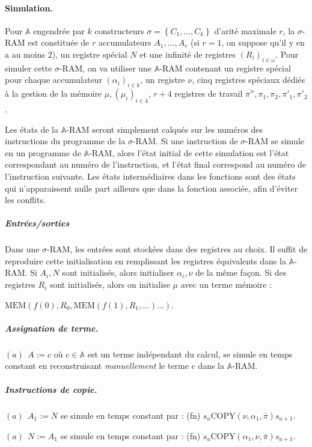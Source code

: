 \documentclass{article}
\newcommand{\bbA}{\mathbb{A}}
\begin{document}
\begin{demo}
				
				\paragraph{Simulation.}
				Pour $\bbA$ engendrée par $k$ constructeurs $\sigma = \left\lbrace C_1, \dots, C_k\right\rbrace$ d'arité maximale $r$, la $\sigma$-RAM est constituée de $r$ accumulateurs $A_1, \dots, A_r$ (si $r = 1$, on suppose qu'il y en a au moins $2$), un registre spécial $N$ et une infinité de registres $(R_i)_{i \in \omega}$. Pour simuler cette $\sigma$-RAM, on va utiliser une $\bbA$-RAM contenant un registre spécial pour chaque accumulateur $(\alpha_i)_{i \in k}$, un registre $\nu$, cinq registres spéciaux dédiés à la gestion de la mémoire $\mu, (\mu_i)_{i \in 4}$, $r+4$ registres de travail $\overline{\pi''}, \pi_1, \pi_2, \pi'_1, \pi'_2$.
				
				Les états de la $\bbA$-RAM seront simplement calqués sur les numéros des instructions du programme de la $\sigma$-RAM. Si une instruction de $\sigma$-RAM se simule en un programme de $\bbA$-RAM, alors l'état initial de cette simulation est l'état correspondant au numéro de l'instruction, et l'état final correspond au numéro de l'instruction suivante. Les états intermédiaires dans les fonctions sont des états qui n'apparaissent nulle part ailleurs que dans la fonction associée, afin d'éviter les conflits. 
					
					\subparagraph{Entrées/sorties}
					Dans une $\sigma$-RAM, les entrées sont stockées dans des registres au choix. Il suffit de reproduire cette initialisation en remplissant les registres équivalents dans la $\bbA$-RAM. Si $A_i, N$ sont initialisés, alors initialiser $\alpha_i, \nu$ de la même façon. Si des registres $R_i$ sont initialisés, alors on initialise $\mu$ avec un terme mémoire : 
					
					$\text{MEM}\left( f(0), R_0, \text{MEM}\left( f(1), R_1, \dots \right) \dots \right)$.
					
					\subparagraph{Assignation de terme.}
					$(a) \:\: A := c$ où $c \in \bbA$ est un terme indépendant du calcul, se simule en temps constant en reconstruisant \emph{manuellement} le terme $c$ dans la $\bbA$-RAM. 
					
					\subparagraph{Instructions de copie.}
					$(a) \:\: A_1 := N$ se simule en temps constant par : (fn) $s_a \text{COPY}(\nu, \alpha_1, \bar{\pi}) s_{a+1}$.
					 
					$(a) \:\: N := A_1$ se simule en temps constant par : (fn) $s_a \text{COPY}(\alpha_1, \nu, \bar{\pi}) s_{a+1}$.
					

\end{demo}
\end{document}
